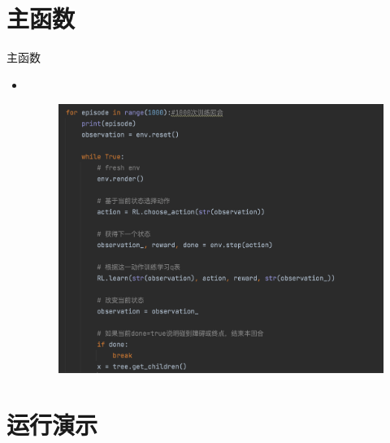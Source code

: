 \documentclass{beamer}
\begin{document}
\section{主函数}
\begin{frame}{主函数}
    \begin{itemize}
    \tiny
    
    \item 
    \\
    
    \begin{minipage}{1\linewidth}
        \medskip
        \begin{figure}[h]
            \centering
            \includegraphics[height=.8\textheight]{pic/16.png}
        \end{figure}
    \end{minipage}
    \end{itemize}
    
\end{frame}

\section{运行演示}
\end{document}
